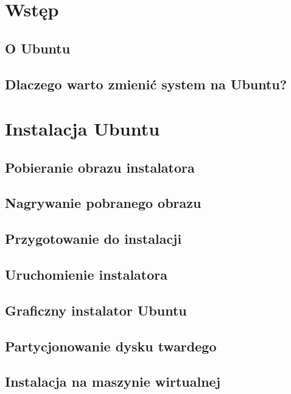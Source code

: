 \documentclass[a4paper,11pt,oneside]{mwart}
\begin{document}


	\section{Wstęp}
	
		\subsection{O Ubuntu}			
			
		\subsection{Dlaczego warto zmienić system na Ubuntu?}
			
	\section{Instalacja Ubuntu}
		\subsection{Pobieranie obrazu instalatora}
			
		\subsection{Nagrywanie pobranego obrazu}
			
		\subsection{Przygotowanie do instalacji}
			
		\subsection{Uruchomienie instalatora}
			
		\subsection{Graficzny instalator Ubuntu}
			
		\subsection{Partycjonowanie dysku twardego}
			
		\subsection{Instalacja na maszynie wirtualnej}
			
\end{document}
